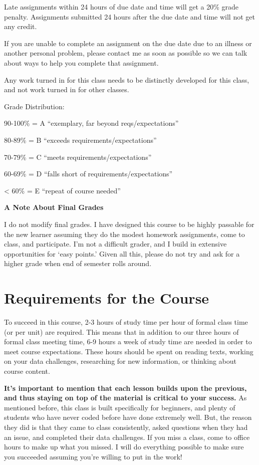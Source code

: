 \documentclass[
]{book}
\begin{document}
Late assignments within 24 hours of due date and time will get a 20\% grade penalty. Assignments submitted 24 hours after the due date and time will not get any credit.

If you are unable to complete an assignment on the due date due to an illness or another personal problem, please contact me as soon as possible so we can talk about ways to help you complete that assignment.

Any work turned in for this class needs to be distinctly developed for this class, and not work turned in for other classes.

Grade Distribution:

90-100\% = A ``exemplary, far beyond reqs/expectations''

80-89\% = B ``exceeds requirements/expectations''

70-79\% = C ``meets requirements/expectations''

60-69\% = D ``falls short of requirements/expectations''

\textless{} 60\% = E ``repeat of course needed''

\textbf{A Note About Final Grades}

I do not modify final grades. I have designed this course to be highly passable for the new learner assuming they do the modest homework assignments, come to class, and participate. I'm not a difficult grader, and I build in extensive opportunities for `easy points.' Given all this, please do not try and ask for a higher grade when end of semester rolls around.

\hypertarget{requirements-for-the-course}{%
\section{Requirements for the Course}\label{requirements-for-the-course}}

To succeed in this course, 2-3 hours of study time per hour of formal class time (or per unit) are required. This means that in addition to our three hours of formal class meeting time, 6-9 hours a week of study time are needed in order to meet course expectations. These hours should be spent on reading texts, working on your data challenges, researching for new information, or thinking about course content.

\textbf{It's important to mention that each lesson builds upon the previous, and thus staying on top of the material is critical to your success.} As mentioned before, this class is built specifically for beginners, and plenty of students who have never coded before have done extremely well. But, the reason they did is that they came to class consistently, asked questions when they had an issue, and completed their data challenges. If you miss a class, come to office hours to make up what you missed. I will do everything possible to make sure you succeeded assuming you're willing to put in the work!
\end{document}
